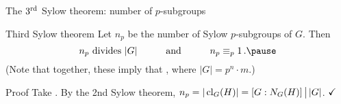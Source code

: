 \documentclass[8pt, handout]{beamer}
\newcommand{\Pause}{\pause}      %
\begin{document}
\begin{frame}{The $3^{\rm rd}$ Sylow theorem: number of $p$-subgroups}

  \begin{block}{Third Sylow theorem}
    Let $n_p$ be the number of Sylow $p$-subgroups of $G$.  Then
    \[
    \mbox{$n_p$ divides $|G|$}\qquad\quad\mbox{and}\qquad\quad
    n_p\equiv_p 1\,. \vspace{-2mm}\Pause
    \]
    (Note that together, these imply that , where
    $|G|=p^n\cdot m$.)
  \end{block}

  \Pause

  \begin{exampleblock}{Proof} %
    Take . By the 2nd Sylow theorem,
    $n_p=|\operatorname{cl}_G(H)|=[G:N_G(H)]\,\big|\,|G|$. $\hfill\checkmark$ \medskip\Pause
    

\end{exampleblock}
\end{frame}
\end{document}

